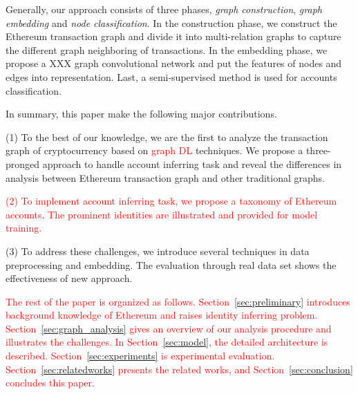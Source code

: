 Generally, our approach consists of three phases, \emph{graph construction}, \emph{graph embedding} and \emph{node classification}. In the construction phase, we construct the Ethereum transaction graph and divide it into multi-relation graphs to capture the different graph neighboring of transactions. In the embedding phase, we propose a XXX graph convolutional network and put the features of nodes and edges into representation. Last, a semi-supervised method is used for accounts classification.

In summary, this paper make the following major contributions.

(1) To the best of our knowledge, we are the first to analyze the transaction graph of cryptocurrency based on \textcolor{red}{graph DL} techniques. We propose a three-pronged approach to handle account inferring task and reveal the differences in analysis between Ethereum transaction graph and other traditional graphs.

\textcolor{red}{(2) To implement account inferring task, we propose a taxonomy of Ethereum accounts. The prominent identities are illustrated and provided for model training.}


(3) To address these challenges, we introduce several techniques in data preprocessing and embedding. The evaluation through real data set shows the effectiveness of new approach.

\textcolor{red}{The rest of the paper is organized as follows. Section~\ref{sec:preliminary} introduces background knowledge of Ethereum and raises identity inferring problem. Section~\ref{sec:graph_analysis} gives an overview of our analysis procedure and illustrates the challenges. In Section~\ref{sec:model}, the detailed architecture is described. Section~\ref{sec:experiments} is experimental evaluation. Section~\ref{sec:relatedworks} presents the related works, and Section~\ref{sec:conclusion} concludes this paper.}



